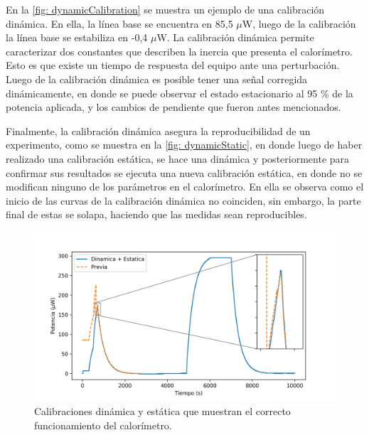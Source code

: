 	En la \autoref{fig: dynamicCalibration} se muestra un ejemplo de una calibración dinámica. En ella, la línea base se encuentra en 85,5 $\mu$W, luego de la calibración la línea base se estabiliza en -0,4 $\mu$W. La calibración dinámica permite caracterizar dos constantes que describen la inercia que presenta el calorímetro. Esto es que existe un tiempo de respuesta del equipo ante una perturbación. Luego de la calibración dinámica es posible tener una señal corregida dinámicamente, en donde se puede observar el estado estacionario al 95 \% de la potencia aplicada, y los cambios de pendiente que fueron antes mencionados.
	
	Finalmente, la calibración dinámica asegura la reproducibilidad de un experimento, como se muestra en la \autoref{fig: dynamicStatic}, en donde luego de haber realizado una calibración estática, se hace una dinámica y posteriormente para confirmar sus resultados se ejecuta una nueva calibración estática, en donde no se modifican ninguno de los parámetros en el calorímetro. En ella se observa como el inicio de las curvas de la calibración dinámica no coinciden, sin embargo, la parte final de estas se solapa, haciendo que las medidas sean reproducibles.
	\begin{figure}[h]
		\centering
		\includegraphics[width=\linewidth]{../Data/ElectricalCalibrations/Both}
		\caption{Calibraciones dinámica y estática que muestran el correcto funcionamiento del calorímetro.}
		\label{fig: dynamicStatic}
	\end{figure}
	